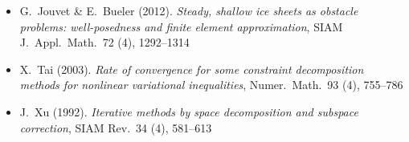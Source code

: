 \begin{itemize}
\item G.~Jouvet \& E.~Bueler (2012). \emph{Steady, shallow ice sheets as obstacle problems: well-posedness and finite element approximation}, SIAM J.~Appl.~Math.~72 (4), 1292--1314 
\item X.~Tai (2003). \emph{Rate of convergence for some constraint decomposition methods for nonlinear variational inequalities}, Numer.~Math.~93 (4), 755--786 
\item J.~Xu (1992). \emph{Iterative methods by space decomposition and subspace correction}, SIAM Rev.~34 (4), 581--613 
\end{itemize}

